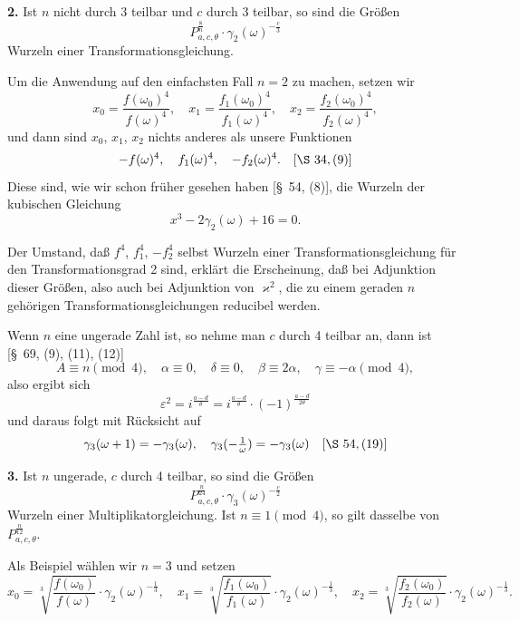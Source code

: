\documentclass[12pt,a4paper]{article}
\theoremstyle{definition}
\begin{document}
\textbf{2.} Ist $n$ nicht durch 3 teilbar und $c$ durch 3 teilbar, so sind die Größen
\[
P_{a,c,\theta}^{\frac{8}{n}} \cdot \gamma_2(\omega)^{-\frac{c}{3}}
\]
Wurzeln einer Transformationsgleichung.

Um die Anwendung auf den einfachsten Fall $n = 2$ zu machen, setzen wir
\[
x_0 = \frac{f(\omega_0)^4}{f(\omega)^4}, \quad x_1 = \frac{f_1(\omega_0)^4}{f_1(\omega)^4}, \quad x_2 = \frac{f_2(\omega_0)^4}{f_2(\omega)^4},
\]
und dann sind $x_0$, $x_1$, $x_2$ nichts anderes als unsere Funktionen
\[
-f(\omega)^4, \quad f_1(\omega)^4, \quad -f_2(\omega)^4. \quad [\S\ 34, (9)]
\]
Diese sind, wie wir schon früher gesehen haben [\S\ 54, (8)], die Wurzeln der kubischen Gleichung
\begin{equation}\label{eq:72-4}
x^3 - 2\gamma_2(\omega) + 16 = 0.
\end{equation}

Der Umstand, daß $f^4$, $f_1^4$, $-f_2^4$ selbst Wurzeln einer Transformationsgleichung für den Transformationsgrad 2 sind, erklärt die Erscheinung, daß bei Adjunktion dieser Größen, also auch bei Adjunktion von $\varkappa^2$, die zu einem geraden $n$ gehörigen Transformationsgleichungen reducibel werden.

Wenn $n$ eine ungerade Zahl ist, so nehme man $c$ durch 4 teilbar an, dann ist [\S\ 69, (9), (11), (12)]
\[
A \equiv n \pmod{4}, \quad \alpha \equiv 0, \quad \delta \equiv 0, \quad \beta \equiv 2\alpha, \quad \gamma \equiv -\alpha \pmod{4},
\]
also ergibt sich
\[
\varepsilon^2 = i^{\frac{a-d}{\theta}} = i^{\frac{a-d}{\theta}} \cdot (-1)^{\frac{a-d}{2\theta}}
\]
und daraus folgt mit Rücksicht auf
\[
\gamma_3(\omega+1) = -\gamma_3(\omega), \quad \gamma_3(-\tfrac{1}{\omega}) = -\gamma_3(\omega) \quad [\S\ 54, (19)]
\]

\textbf{3.} Ist $n$ ungerade, $c$ durch 4 teilbar, so sind die Größen
\[
P_{a,c,\theta}^{\frac{n}{24}} \cdot \gamma_3(\omega)^{-\frac{c}{2}}
\]
Wurzeln einer Multiplikatorgleichung. Ist $n \equiv 1 \pmod{4}$, so gilt dasselbe von $P_{a,c,\theta}^{\frac{n}{12}}$.

Als Beispiel wählen wir $n = 3$ und setzen
\[
x_0 = \sqrt[3]{\frac{f(\omega_0)}{f(\omega)}} \cdot \gamma_2(\omega)^{-\frac{1}{3}}, \quad x_1 = \sqrt[3]{\frac{f_1(\omega_0)}{f_1(\omega)}} \cdot \gamma_2(\omega)^{-\frac{1}{3}}, \quad x_2 = \sqrt[3]{\frac{f_2(\omega_0)}{f_2(\omega)}} \cdot \gamma_2(\omega)^{-\frac{1}{3}}.
\]
\end{document}
